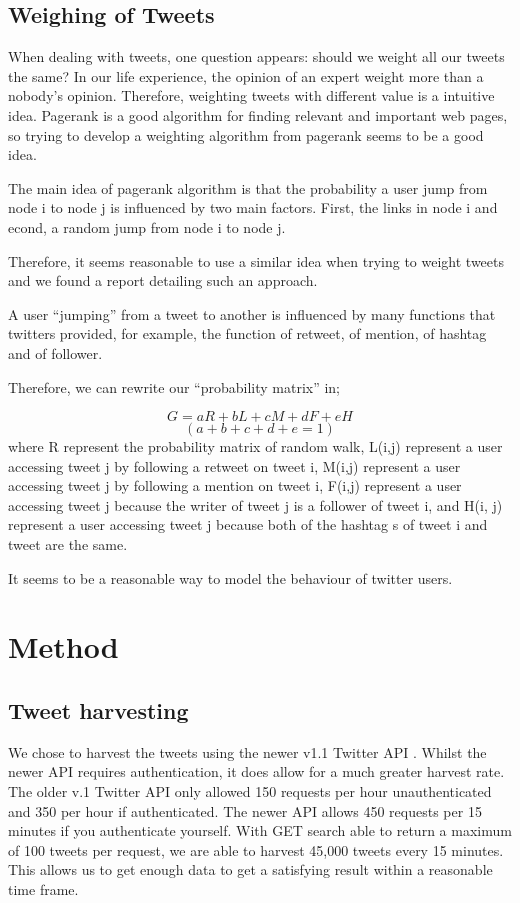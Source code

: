 \documentclass[a4paper]{article}
\begin{document}
\subsection{Weighing of Tweets}
When dealing with tweets, one question appears: should we weight all our tweets the same? In our life experience, the opinion of an expert weight more than a nobody’s opinion. Therefore, weighting tweets with different value is a intuitive idea. Pagerank is a good algorithm for finding relevant and important web pages, so trying to develop a weighting algorithm from pagerank seems to be a good idea.

The main idea of pagerank algorithm is that the probability a user jump from node i to node j is influenced by two main factors. First, the links in node i and econd, a random jump from node i to node j.

Therefore, it seems reasonable to use a similar idea when trying to weight tweets and we found a report \cite{weight2} detailing such an approach.

A user “jumping” from a tweet to another is influenced by many functions that twitters provided, for example, the function of retweet, of mention, of hashtag and of follower.

Therefore, we can rewrite our “probability matrix” in;

\[G = aR + bL + cM + dF + eH\]
\[(a + b + c + d + e = 1)\]
where R represent the probability matrix of random walk, L(i,j) represent a user accessing tweet j by following a retweet on tweet i, M(i,j) represent a user accessing tweet j by following a mention on tweet i, F(i,j) represent a user accessing  tweet j because the writer of tweet j is a follower of tweet i, and H(i, j) represent a user accessing tweet j because both of the hashtag s of tweet i and tweet are the same.

It seems to be a reasonable way to model the behaviour of twitter users.

\section{Method}
\subsection{Tweet harvesting}
We chose to harvest the tweets using the newer v1.1 Twitter API \cite{tw_api}. Whilst the newer API requires authentication, it does allow for a much greater harvest rate. The older v.1 Twitter API \cite{tw_api_1_0} only allowed 150 requests per hour unauthenticated and 350 per hour if authenticated. The newer API allows 450 requests per 15 minutes if you authenticate yourself. With GET search able to return a maximum of 100 tweets per request, we are able to harvest 45,000 tweets every 15 minutes. This allows us to get enough data to get a satisfying result within a reasonable time frame.
\end{document}
